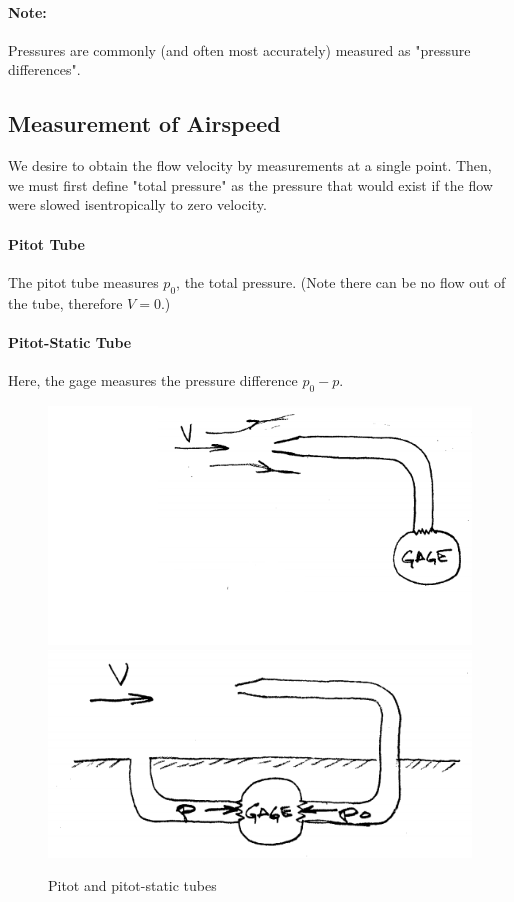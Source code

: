 \documentclass[draft=false, titlepage]{article}
\begin{document}
\paragraph*{Note:} Pressures are commonly (and often most accurately) measured as "pressure differences".

\subsection{Measurement of Airspeed}
We desire to obtain the flow velocity by measurements at a single point. Then, we must first define "total pressure" as the pressure that would exist if the flow were slowed isentropically to zero velocity.
\paragraph*{Pitot Tube}
The pitot tube measures $p_0$, the total pressure. (Note there can be no flow out of the tube, therefore $V=0$.)
\paragraph*{Pitot-Static Tube}
Here, the gage measures the pressure difference $p_0-p$.

\begin{figure}[ht]
	\centering
	\includegraphics[width=0.4\linewidth]{Figures/p11_pitot.PNG}
	\includegraphics[width=0.4\linewidth]{Figures/p11_pitotStatic.PNG}
	\caption{Pitot and pitot-static tubes}
	\label{fig:p11_pitotStatic}
\end{figure}
\end{document}
